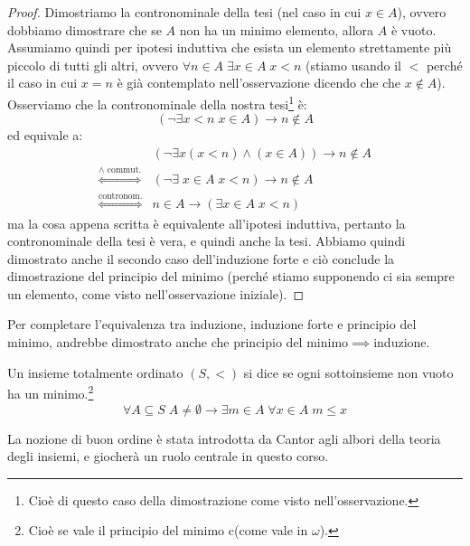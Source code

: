 \documentclass[11pt]{scrartcl}
\begin{document}
\begin{proof}
	Dimostriamo la contronominale della tesi (nel caso in cui $x \in A$), ovvero dobbiamo dimostrare che se $A$ non ha un minimo elemento, allora $A$ è vuoto. \\
	Assumiamo quindi per ipotesi induttiva che esista un elemento strettamente più piccolo di tutti gli altri, ovvero $\forall n \in A \; \exists x \in A \; x < n$ (stiamo usando il $<$ perché il caso in cui $x = n$ è già contemplato nell'osservazione dicendo che che $x \not \in A$).
	Osserviamo che la contronominale della nostra tesi\footnote{Cioè di questo caso della dimostrazione come visto nell'osservazione.} è:
	\[ (\neg \exists x < n \; x \in A) \rightarrow n \not \in A
		\]
	ed equivale a:
	\[	\begin{split}
		& (\neg \exists x (x < n) \land (x \in A)) \rightarrow n \not \in A \\
		\overset{\text{$\land$ commut.}}{\iff} & (\neg \exists \; x \in A \; x < n) \rightarrow n \not \in A \\
		\overset{\text{contronom.}}{\iff} & n \in A \rightarrow (\exists x \in A \; x < n)
		\end{split}
		\]
	ma la cosa appena scritta è equivalente all'ipotesi induttiva, pertanto la contronominale della tesi è vera, e quindi anche la tesi. Abbiamo quindi dimostrato anche il secondo caso dell'induzione forte e ciò conclude la dimostrazione del principio del minimo (perché stiamo supponendo ci sia sempre un elemento, come visto nell'osservazione iniziale).
\end{proof}


\begin{remark}
	Per completare l'equivalenza tra induzione, induzione forte e principio del minimo, andrebbe dimostrato anche che principio del minimo$\implies$induzione.
\end{remark}

\begin{definition}
	Un insieme totalmente ordinato $(S, <)$ si dice  se ogni sottoinsieme non vuoto ha un minimo.\footnote{Cioè se vale il principio del minimo c(come vale in $\omega$).}
	\[ \forall A \subseteq S \; A \ne \emptyset \rightarrow \exists m \in A \; \forall x \in A \; m \leq x
		\]
\end{definition}

La nozione di buon ordine è stata introdotta da Cantor agli albori della teoria degli insiemi, e giocherà un ruolo centrale in questo corso.
\end{document}

